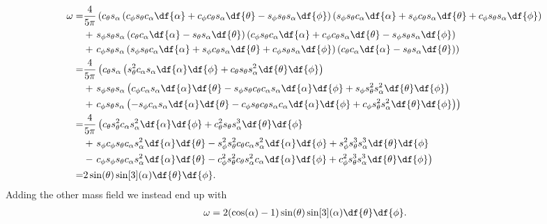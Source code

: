 \begin{align*}
	\omega =& \frac{4}{5\pi}\left(c_{\theta}s_{\alpha}\left(c_{\phi}s_{\theta}c_{\alpha}\df{\alpha} + c_{\phi}c_{\theta}s_{\alpha}\df{\theta} - s_{\phi}s_{\theta}s_{\alpha}\df{\phi}\right)\left(s_{\phi}s_{\theta}c_{\alpha}\df{\alpha} + s_{\phi}c_{\theta}s_{\alpha}\df{\theta} + c_{\phi}s_{\theta}s_{\alpha}\df{\phi}\right) \right. \\
	        &+ \left. s_{\phi}s_{\theta}s_{\alpha}\left(c_{\theta}c_{\alpha}\df{\alpha} - s_{\theta}s_{\alpha}\df{\theta}\right)\left(c_{\phi}s_{\theta}c_{\alpha}\df{\alpha} + c_{\phi}c_{\theta}s_{\alpha}\df{\theta} - s_{\phi}s_{\theta}s_{\alpha}\df{\phi}\right) \right. \\
	        &+ \left. c_{\phi}s_{\theta}s_{\alpha}\left(s_{\phi}s_{\theta}c_{\alpha}\df{\alpha} + s_{\phi}c_{\theta}s_{\alpha}\df{\theta} + c_{\phi}s_{\theta}s_{\alpha}\df{\phi}\right)\left(c_{\theta}c_{\alpha}\df{\alpha} - s_{\theta}s_{\alpha}\df{\theta}\right)\right) \\
	       =& \frac{4}{5\pi}\left(c_{\theta}s_{\alpha}\left(s_{\theta}^{2}c_{\alpha}s_{\alpha}\df{\alpha}\df{\phi} + c_{\theta}s_{\theta}s_{\alpha}^{2}\df{\theta}\df{\phi}\right) \right. \\
	        &+ \left. s_{\phi}s_{\theta}s_{\alpha}\left(c_{\phi}c_{\alpha}s_{\alpha}\df{\alpha}\df{\theta} - s_{\phi}s_{\theta}c_{\theta}c_{\alpha}s_{\alpha}\df{\alpha}\df{\phi} + s_{\phi}s_{\theta}^{2}s_{\alpha}^{2}\df{\theta}\df{\phi}\right) \right. \\
	        &+ \left. c_{\phi}s_{\theta}s_{\alpha}\left(-s_{\phi}c_{\alpha}s_{\alpha}\df{\alpha}\df{\theta} - c_{\phi}s_{\theta}c_{\theta}s_{\alpha}c_{\alpha}\df{\alpha}\df{\phi} + c_{\phi}s_{\theta}^{2}s_{\alpha}^{2}\df{\theta}\df{\phi}\right)\right) \\
	       =& \frac{4}{5\pi}\left(c_{\theta}s_{\theta}^{2}c_{\alpha}s_{\alpha}^{2}\df{\alpha}\df{\phi} + c_{\theta}^{2}s_{\theta}s_{\alpha}^{3}\df{\theta}\df{\phi} \right. \\
	        &+ \left. s_{\phi}c_{\phi}s_{\theta}c_{\alpha}s_{\alpha}^{2}\df{\alpha}\df{\theta} - s_{\phi}^{2}s_{\theta}^{2}c_{\theta}c_{\alpha}s_{\alpha}^{2}\df{\alpha}\df{\phi} + s_{\phi}^{2}s_{\theta}^{3}s_{\alpha}^{3}\df{\theta}\df{\phi} \right. \\
	        &- \left. c_{\phi}s_{\phi}s_{\theta}c_{\alpha}s_{\alpha}^{2}\df{\alpha}\df{\theta} - c_{\phi}^{2}s_{\theta}^{2}c_{\theta}s_{\alpha}^{2}c_{\alpha}\df{\alpha}\df{\phi} + c_{\phi}^{2}s_{\theta}^{3}s_{\alpha}^{3}\df{\theta}\df{\phi}\right) \\
	       =& 2\sin(\theta)\sin[3](\alpha)\df{\theta}\df{\phi}.
\end{align*}
Adding the other mass field we instead end up with
\begin{align*}
	\omega = 2(\cos(\alpha) - 1)\sin(\theta)\sin[3](\alpha)\df{\theta}\df{\phi}.
\end{align*}

